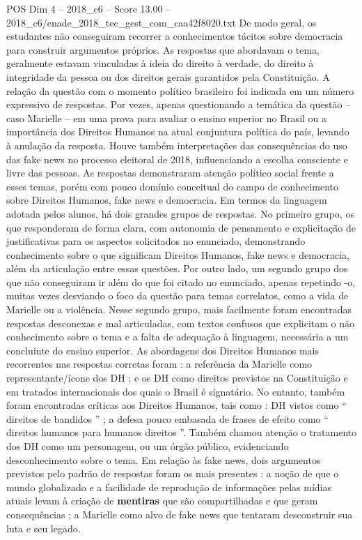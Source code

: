 \begin{textsample}{POS Dim 4 – 2018\_c6 – Score 13.00 – 2018\_c6/enade\_2018\_tec\_gest\_com\_caa42f8020.txt}
De modo geral, os estudantes não conseguiram recorrer a conhecimentos tácitos sobre democracia para construir argumentos próprios.
As respostas que abordavam o tema, geralmente estavam vinculadas à ideia do direito à verdade, do direito à integridade da pessoa ou dos direitos gerais garantidos pela Constituição.
A relação da questão com o momento político brasileiro foi indicada em um número expressivo de respostas.
Por vezes, apenas questionando a temática da questão – caso Marielle – em uma prova para avaliar o ensino superior no Brasil ou a importância dos Direitos Humanos na atual conjuntura política do país, levando à anulação da resposta.
Houve também interpretações das consequências do uso das fake news no processo eleitoral de 2018, influenciando a escolha consciente e livre das pessoas.
As respostas demonstraram atenção político social frente a esses temas, porém com pouco domínio conceitual do campo de conhecimento sobre Direitos Humanos, fake news e democracia.
Em termos da linguagem adotada pelos alunos, há dois grandes grupos de respostas.
No primeiro grupo, os que responderam de forma clara, com autonomia de pensamento e explicitação de justificativas para os aspectos solicitados no enunciado, demonstrando conhecimento sobre o que significam Direitos Humanos, fake news e democracia, além da articulação entre essas questões.
Por outro lado, um segundo grupo dos que não conseguiram ir além do que foi citado no enunciado, apenas repetindo -o, muitas vezes desviando o foco da questão para temas correlatos, como a vida de Marielle ou a violência.
Nesse segundo grupo, mais facilmente foram encontradas respostas desconexas e mal articuladas, com textos confusos que explicitam o não conhecimento sobre o tema e a falta de adequação à linguagem, necessária a um concluinte do ensino superior.
As abordagens dos Direitos Humanos mais recorrentes nas respostas corretas foram : a referência da Marielle como representante/ícone dos DH ; e os DH como direitos previstos na Constituição e em tratados internacionais dos quais o Brasil é signatário.
No entanto, também foram encontradas críticas aos Direitos Humanos, tais como : DH vistos como “ direitos de bandidos ” ; a defesa pouco embasada de frases de efeito como “ direitos humanos para humanos direitos ”.
Também chamou atenção o tratamento dos DH como um personagem, ou um órgão público, evidenciando desconhecimento sobre o tema.
Em relação às fake news, dois argumentos previstos pelo padrão de respostas foram os mais presentes : a noção de que o mundo globalizado e a facilidade de reprodução de informações pelas mídias atuais levam à criação de \textbf{mentiras} que são compartilhadas e que geram consequências ; a Marielle como alvo de fake news que tentaram desconstruir sua luta e seu legado.

\end{textsample}
